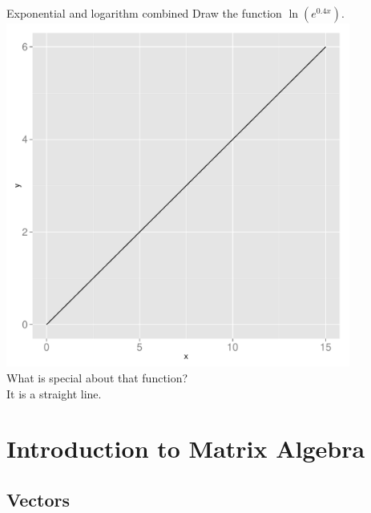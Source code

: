 \documentclass[a4paper]{report}
\begin{document}
\begin{Answer}[ref=exexln]
\Question Exponential and logarithm combined
\subQuestion Draw the function $\ln(e^{0.4x})$.\\
\includegraphics[width=0.85\textwidth]{ex_exp_ln_plot.pdf}\\
\subQuestion What is special about that function?\\
It is a straight line.
\end{Answer}


\chapter{Introduction to Matrix Algebra}
\section{Vectors}
\end{document}
